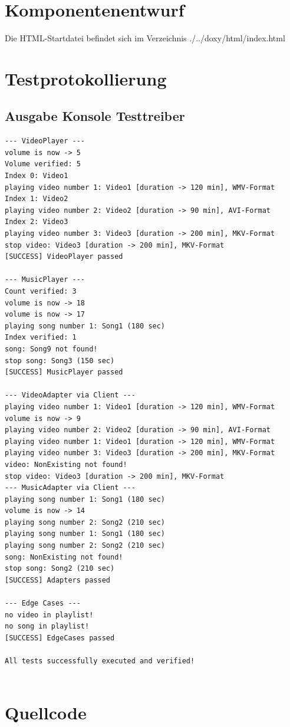 \documentclass[a4paper,12pt]{article}
\begin{document}
\section{Komponentenentwurf}
Die HTML-Startdatei befindet sich im Verzeichnis ./../doxy/html/index.html

\newpage
\section{Testprotokollierung}
\subsection{Ausgabe Konsole Testtreiber}
\begin{lstlisting}[style=textstyle]
--- VideoPlayer ---
volume is now -> 5
Volume verified: 5
Index 0: Video1
playing video number 1: Video1 [duration -> 120 min], WMV-Format
Index 1: Video2
playing video number 2: Video2 [duration -> 90 min], AVI-Format
Index 2: Video3
playing video number 3: Video3 [duration -> 200 min], MKV-Format
stop video: Video3 [duration -> 200 min], MKV-Format
[SUCCESS] VideoPlayer passed

--- MusicPlayer ---
Count verified: 3
volume is now -> 18
volume is now -> 17
playing song number 1: Song1 (180 sec)
Index verified: 1
song: Song9 not found!
stop song: Song3 (150 sec)
[SUCCESS] MusicPlayer passed

--- VideoAdapter via Client ---
playing video number 1: Video1 [duration -> 120 min], WMV-Format
volume is now -> 9
playing video number 2: Video2 [duration -> 90 min], AVI-Format
playing video number 1: Video1 [duration -> 120 min], WMV-Format
playing video number 3: Video3 [duration -> 200 min], MKV-Format
video: NonExisting not found!
stop video: Video3 [duration -> 200 min], MKV-Format
--- MusicAdapter via Client ---
playing song number 1: Song1 (180 sec)
volume is now -> 14
playing song number 2: Song2 (210 sec)
playing song number 1: Song1 (180 sec)
playing song number 2: Song2 (210 sec)
song: NonExisting not found!
stop song: Song2 (210 sec)
[SUCCESS] Adapters passed

--- Edge Cases ---
no video in playlist!
no song in playlist!
[SUCCESS] EdgeCases passed

All tests successfully executed and verified!


\end{lstlisting}

\newpage
\section{Quellcode}
\end{document}
